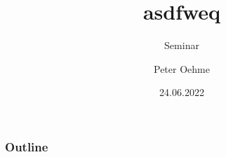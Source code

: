 \documentclass{beamer}
\title{asdfweq}
\subtitle{Seminar}
\author{Peter Oehme}
\date{24.06.2022}
\begin{document}
    \frame{\titlepage}

    \begin{frame}
        \frametitle{Outline}
        \tableofcontents
    \end{frame}

    

    

    

    
\end{document}
